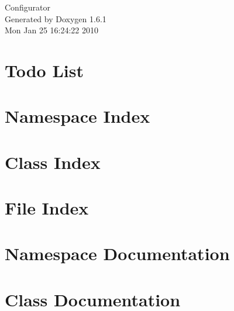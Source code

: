\documentclass[a4paper]{book}
\begin{document}
\hypersetup{pageanchor=false}
\begin{titlepage}
\vspace*{7cm}
\begin{center}
{\Large Configurator }\\
\vspace*{1cm}
{\large Generated by Doxygen 1.6.1}\\
\vspace*{0.5cm}
{\small Mon Jan 25 16:24:22 2010}\\
\end{center}
\end{titlepage}
\clearemptydoublepage
{}
\tableofcontents
\clearemptydoublepage
{}
\hypersetup{pageanchor=true}
\chapter{Todo List}
\label{todo}
\hypertarget{todo}{}

\chapter{Namespace Index}

\chapter{Class Index}

\chapter{File Index}

\chapter{Namespace Documentation}


\chapter{Class Documentation}












\end{document}
